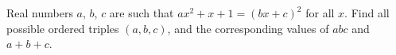 Real numbers $a$, $b$, $c$ are such that $ax^2+x+1=(bx+c)^2$ for all $x$. Find all possible ordered triples $(a,b,c)$, and the corresponding values of $abc$ and $a+b+c$.
